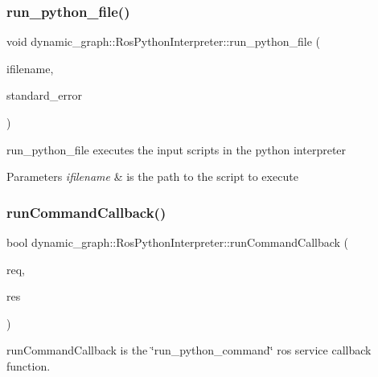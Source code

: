 \subsubsection{\texorpdfstring{run\+\_\+python\+\_\+file()}{run\_python\_file()}}
{\footnotesize\ttfamily void dynamic\+\_\+graph\+::\+Ros\+Python\+Interpreter\+::run\+\_\+python\+\_\+file (\begin{DoxyParamCaption}\item[{const std\+::string}]{ifilename,  }\item[{std\+::string \&}]{standard\+\_\+error }\end{DoxyParamCaption})}



run\+\_\+python\+\_\+file executes the input scripts in the python interpreter 


\begin{DoxyParams}{Parameters}
{\em ifilename} & is the path to the script to execute \\
\hline
\end{DoxyParams}
\mbox{\label{classdynamic__graph_1_1RosPythonInterpreter_af589eb361f3193c48c7e7f2eb5a3ff64}} 
\subsubsection{\texorpdfstring{run\+Command\+Callback()}{runCommandCallback()}}
{\footnotesize\ttfamily bool dynamic\+\_\+graph\+::\+Ros\+Python\+Interpreter\+::run\+Command\+Callback (\begin{DoxyParamCaption}\item[{dynamic\+\_\+graph\+\_\+manager\+::\+Run\+Command\+::\+Request \&}]{req,  }\item[{dynamic\+\_\+graph\+\_\+manager\+::\+Run\+Command\+::\+Response \&}]{res }\end{DoxyParamCaption})\hspace{0.3cm}{\ttfamily [protected]}}



run\+Command\+Callback is the \char`\"{}run\+\_\+python\+\_\+command\char`\"{} ros service callback function. 


